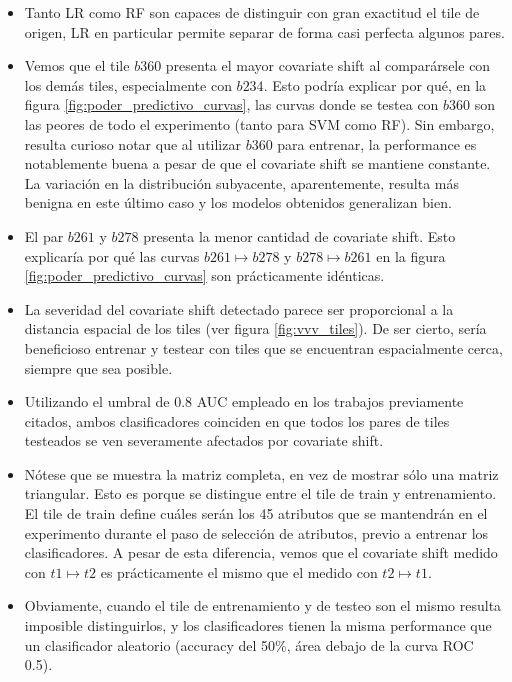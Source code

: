 \begin{itemize}
\item Tanto LR como RF son capaces de distinguir con gran exactitud el tile de origen, LR en particular permite separar de forma casi perfecta algunos pares.
\item Vemos que el tile $b360$ presenta el mayor covariate shift al comparársele con los demás tiles, especialmente con $b234$. Esto podría explicar por qué, en la figura \ref{fig:poder_predictivo_curvas}, las curvas donde se testea con $b360$ son las peores de todo el experimento (tanto para SVM como RF). Sin embargo, resulta curioso notar que al utilizar $b360$ para entrenar, la performance es notablemente buena a pesar de que el covariate shift se mantiene constante. La variación en la distribución subyacente, aparentemente, resulta más benigna en este último caso y los modelos obtenidos generalizan bien.
\item El par $b261$ y $b278$ presenta la menor cantidad de covariate shift. Esto explicaría por qué las curvas $b261 \mapsto b278$ y $b278 \mapsto b261$ en la figura \ref{fig:poder_predictivo_curvas} son prácticamente idénticas.
\item La severidad del covariate shift detectado parece ser proporcional a la distancia espacial de los tiles (ver figura \ref{fig:vvv_tiles}). De ser cierto, sería beneficioso entrenar y testear con tiles que se encuentran espacialmente cerca, siempre que sea posible.
\item Utilizando el umbral de 0.8 AUC empleado en los trabajos previamente citados, ambos clasificadores coinciden en que todos los pares de tiles testeados se ven severamente afectados por covariate shift.
\item Nótese que se muestra la matriz completa, en vez de mostrar sólo una matriz triangular. Esto es porque se distingue entre el tile de train y entrenamiento. El tile de train define cuáles serán los 45 atributos que se mantendrán en el experimento durante el paso de selección de atributos, previo a entrenar los clasificadores. A pesar de esta diferencia, vemos que el covariate shift medido con $t1 \mapsto t2$ es prácticamente el mismo que el medido con $t2 \mapsto t1$.
\item Obviamente, cuando el tile de entrenamiento y de testeo son el mismo resulta imposible distinguirlos, y los clasificadores tienen la misma performance que un clasificador aleatorio (accuracy del 50\%, área debajo de la curva ROC 0.5).
\end{itemize}

